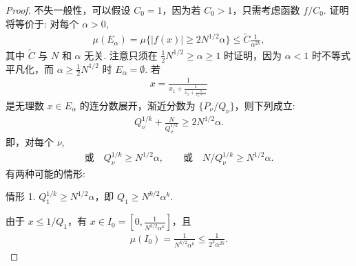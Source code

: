 \begin{proof}
不失一般性，可以假设 $C_0 = 1$，因为若 $C_0 > 1$，只需考虑函数 $f/C_0$. 证明将等价于: 对每个 $\alpha > 0$,
\begin{align*}
  \mu(E_{\alpha})=\mu\{|f(x)|\geq 2N^{1/2}\alpha\}\leq\widetilde{C}\frac{1}{\alpha^{2k}},
\end{align*}
其中 $\widetilde{C}$ 与 $N$ 和 $\alpha$ 无关. 注意只须在 $\frac{1}{2}N^{1/2} \geq \alpha \geq 1$ 时证明，因为 $\alpha < 1$ 时不等式平凡化，而 $\alpha \geq \frac{1}{2}N^{1/2}$ 时 $E_{\alpha} = \emptyset$. 若
\begin{align*}
  x=\frac{1}{x_{1}+\frac{1}{x_{2}+\frac{1}{x_{3}+\cdots}}}
\end{align*}
是无理数 $x \in E_\alpha$ 的连分数展开，渐近分数为 $\{P_\nu/Q_\nu\}$，则下列成立:
\begin{align*}
  Q_{\nu}^{1/k}+\frac{N}{Q_{\nu}^{1/k}}\geq 2N^{1/2}\alpha.
\end{align*}
即，对每个 $\nu$,
\begin{align*}
  \text{或}\quad Q_{\nu}^{1/k}\geq N^{1/2}\alpha,\qquad
  \text{或}\quad N/Q_{\nu}^{1/k}\geq N^{1/2}\alpha.
\end{align*}
有两种可能的情形:

情形 1. $Q_1^{1/k} \geq N^{1/2}\alpha$，即 $Q_1 \geq N^{k/2}\alpha^k$.

由于 $x \leq 1/Q_1$，有 $x \in I_0 = [0, \frac{1}{N^{k/2}\alpha^k}]$，且
\begin{align*}
  \mu(I_{0})=\frac{1}{N^{k/2}\alpha^{k}}\leq\frac{1}{2^{k}\alpha^{2k}}.
\end{align*}


\end{proof}
